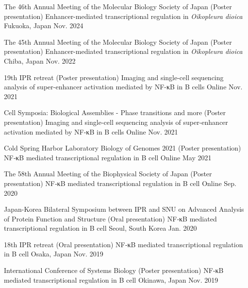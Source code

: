 
\begin{cventries}

  \cventrypub
    {The 46th Annual Meeting of the Molecular Biology Society of Japan (Poster presentation)} %
    {Enhancer-mediated transcriptional regulation in \textit{Oikopleura dioica}} %
    {Fukuoka, Japan} %
    {Nov. 2024} %

  \cventrypub
    {The 45th Annual Meeting of the Molecular Biology Society of Japan (Poster presentation)} %
    {Enhancer-mediated transcriptional regulation in \textit{Oikopleura dioica}} %
    {Chiba, Japan} %
    {Nov. 2022} %

  \cventrypub
    {19th IPR retreat (Poster presentation)} %
    {Imaging and single-cell sequencing analysis of super-enhancer activation mediated by NF-κB in B cells} %
    {Online} %
    {Nov. 2021} %

  \cventrypub
    {Cell Symposia: Biological Assemblies - Phase transitions and more (Poster presentation)} %
    {Imaging and single-cell sequencing analysis of super-enhancer activation mediated by NF-κB in B cells} %
    {Online} %
    {Nov. 2021} %

  \cventrypub
    {Cold Spring Harbor Laboratory Biology of Genomes 2021 (Poster presentation)} %
    {NF‑κB mediated transcriptional regulation in B cell} %
    {Online} %
    {May 2021} %

  \cventrypub
    {The 58th Annual Meeting of the Biophysical Society of Japan (Poster presentation)} %
    {NF‑κB mediated transcriptional regulation in B cell} %
    {Online} %
    {Sep. 2020} %

  \cventrypub
    {Japan-Korea Bilateral Symposium between IPR and SNU on Advanced Analysis of Protein Function and Structure (Oral presentation)} %
    {NF‑κB mediated transcriptional regulation in B cell} %
    {Seoul, South Korea} %
    {Jan. 2020} %

  \cventrypub
    {18th IPR retreat (Oral presentation)} %
    {NF‑κB mediated transcriptional regulation in B cell} %
    {Osaka, Japan} %
    {Nov. 2019} %

  \cventrypublast
    {International Conference of Systems Biology (Poster presentation)} %
    {NF‑κB mediated transcriptional regulation in B cell} %
    {Okinawa, Japan} %
    {Nov. 2019} %


\end{cventries}
  